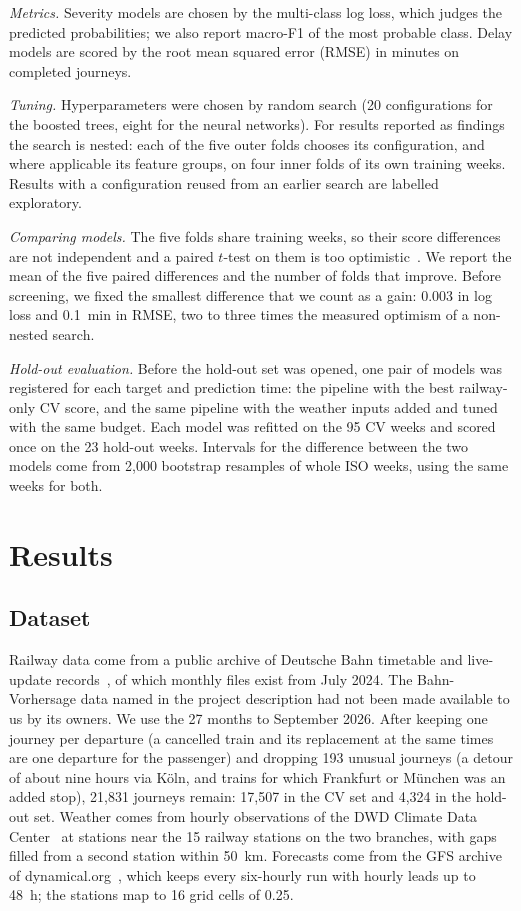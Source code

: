\documentclass[conference]{IEEEtran}
\begin{document}
\emph{Metrics.} Severity models are chosen by the multi-class log loss, which judges the predicted
probabilities; we also report macro-F1 of the most probable class. Delay models are scored by the
root mean squared error (RMSE) in minutes on completed journeys.

\emph{Tuning.} Hyperparameters were chosen by random search (20 configurations for the boosted
trees, eight for the neural networks). For results reported as findings the search is nested: each
of the five outer folds chooses its configuration, and where applicable its feature groups, on four
inner folds of its own training weeks. Results with a configuration reused from an earlier search
are labelled exploratory.

\emph{Comparing models.} The five folds share training weeks, so their score differences are not
independent and a paired $t$-test on them is too
optimistic~\cite{bengio2004variance}. We report the mean of the five paired differences and the
number of folds that improve. Before screening, we fixed the smallest difference that we count as a
gain: 0.003 in log loss and 0.1~min in RMSE, two to three times the measured optimism of a
non-nested search.

\emph{Hold-out evaluation.} Before the hold-out set was opened, one pair of models was registered
for each target and prediction time: the pipeline with the best railway-only CV score, and the same
pipeline with the weather inputs added and tuned with the same budget. Each model was refitted on
the 95 CV weeks and scored once on the 23 hold-out weeks. Intervals for the difference between the
two models come from 2{,}000 bootstrap resamples of whole ISO weeks, using the same weeks for both.

\section{Results}
\label{sec:results}

\subsection{Dataset}

Railway data come from a public archive of Deutsche Bahn timetable and live-update
records~\cite{piebro_db_data}, of which monthly files exist from July 2024. The
Bahn-Vorhersage data named in the project description had not been made available to us by its
owners. We use the
27 months to September 2026. After keeping one journey per departure (a cancelled train and its
replacement at the same times are one departure for the passenger) and dropping 193 unusual journeys
(a detour of about nine hours via K\"oln, and trains for which Frankfurt or M\"unchen was an added
stop), 21{,}831 journeys remain: 17{,}507 in the CV set and 4{,}324 in the hold-out set. Weather
comes from hourly observations of the DWD Climate Data Center~\cite{dwd_cdc} at stations near the
15 railway stations on the two branches, with gaps filled from a second station within 50~km.
Forecasts come from the GFS archive of dynamical.org~\cite{dynamical_gfs}, which keeps every
six-hourly run with hourly leads up to 48~h; the stations map to 16 grid cells of 0.25\textdegree.
\end{document}
